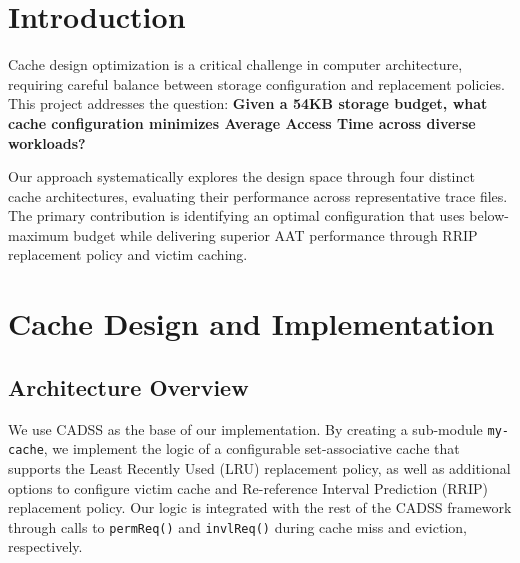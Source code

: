 \documentclass[sigconf,nonacm,natbib=false]{acmart}
\begin{document}




\maketitle

\section{Introduction}

Cache design optimization is a critical challenge in computer architecture, requiring careful balance between storage configuration and replacement policies. This project addresses the question: \textbf{Given a 54KB storage budget, what cache configuration minimizes Average Access Time across diverse workloads?}

Our approach systematically explores the design space through four distinct cache architectures, evaluating their performance across representative trace files. The primary contribution is identifying an optimal configuration that uses below-maximum budget while delivering superior AAT performance through RRIP replacement policy and victim caching.

\section{Cache Design and Implementation}

\subsection{Architecture Overview}

We use CADSS \cite{CADSS} as the base of our implementation. By creating a sub-module \texttt{my-cache}, we implement the logic of a configurable set-associative cache that supports the Least Recently Used (LRU) replacement policy, as well as additional options to configure victim cache and Re-reference Interval Prediction (RRIP) replacement policy. Our logic is integrated with the rest of the CADSS framework through calls to \texttt{permReq()} and \texttt{invlReq()} during cache miss and eviction, respectively.
\end{document}
